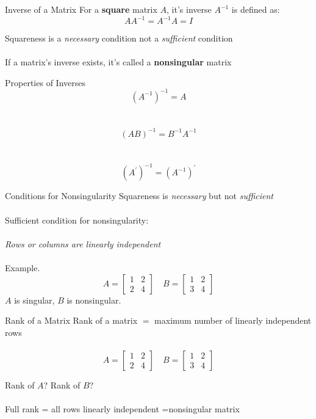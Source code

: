 \documentclass{./../../Latex/teaching_slides}
\begin{document}
\begin{frame}{Inverse of a Matrix}
For a \textbf{square} matrix $A$, it's inverse $A^{-1}$ is defined as:
$$
A A^{-1}=A^{-1} A=I
$$

\vspace{2em}
 Squareness is a \textit{necessary} condition not a \textit{sufficient} condition \\~\\
 If a matrix's inverse exists, it's called a \textbf{nonsingular} matrix
\end{frame}

\begin{frame}{Properties of Inverses}
$$ \left(A^{-1}\right)^{-1}=A $$ \\~\\
$$ (A B)^{-1}=B^{-1} A^{-1} $$ \\~\\
$$ \left(A^{\prime}\right)^{-1}=\left(A^{-1}\right)^{\prime} $$
\end{frame}

\begin{frame}{Conditions for Nonsingularity}
Squareness is \textit{necessary} but not  \textit{sufficient} \\~\\
Sufficient condition for nonsingularity: \\~\\
\hspace{1em} \textit{Rows or columns are linearly independent} \\~\\
Example. $$
A=\left[\begin{array}{ll}
1 & 2 \\
2 & 4
\end{array}\right]
\quad
B=\left[\begin{array}{ll}
1 & 2 \\
3 & 4
\end{array}\right]
$$
\pause $A$ is singular, $B$ is nonsingular.
\end{frame}


\begin{frame}{Rank of a Matrix}
Rank of a matrix $=$ maximum number of linearly independent rows \\~\\
$$A=\left[\begin{array}{ll}
1 & 2 \\
2 & 4
\end{array}\right]
\quad
B=\left[\begin{array}{ll}
1 & 2 \\
3 & 4
\end{array}\right]
$$
\vspace{1em}

Rank of $A$? Rank of $B$? \\~\\

Full rank = all rows linearly independent =nonsingular matrix
\end{frame}
\end{document}
